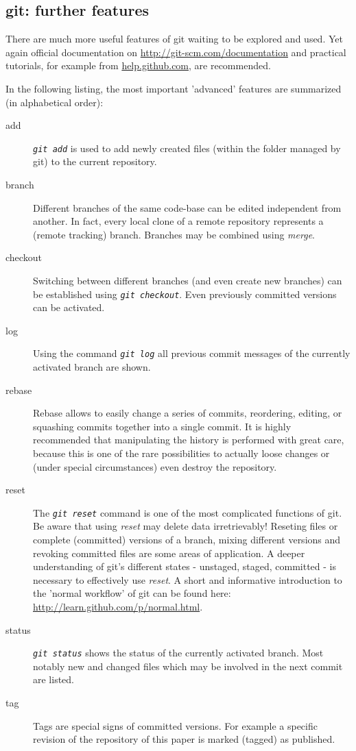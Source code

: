 \documentclass{ifacconf}
\begin{document}
\subsection{git: further features}
There are much more useful features of git waiting to be explored and used. Yet again
official documentation on \url{http://git-scm.com/documentation} and practical
tutorials, for example from \url{help.github.com}, are recommended.

In the following listing, the most important 'advanced' features are summarized
(in alphabetical order):
\begin{description}
\item [add] \textit{\lstinline!git add!} is used to add newly created files (within the  folder managed by git) to the current repository.
\item [{branch}] Different branches of the same code-base can be edited independent from
another. In fact, every local clone of a remote repository represents a (remote tracking) 
branch. Branches may be combined using \textit{merge}.
\item [checkout] Switching between different branches (and even create new branches) can
be established using \textit{\lstinline!git checkout!}. Even previously committed versions
can be activated.
\item [log] Using the command \textit{\lstinline!git log!} all previous commit messages of
the currently activated branch are shown.
\item [{rebase}] Rebase allows to easily change a series of commits, reordering, editing, or squashing commits together into a single commit. 
It is highly recommended that manipulating the history is performed with great care, because this is one of the 
rare possibilities to actually loose changes or (under special circumstances) even destroy the repository.
\item [reset] The \textit{\lstinline!git reset!} command is one of the most complicated
functions of git. Be aware that using \textit{reset} may delete data
irretrievably! Reseting files or complete (committed) versions
of a branch, mixing different versions and revoking committed files are some areas of application. 
A deeper understanding of git's different states -
unstaged, staged, committed - is necessary to effectively use \textit{reset}. A short
and informative introduction to the 'normal workflow' of git can be found here: \url{http://learn.github.com/p/normal.html}.
\item [status] \textit{\lstinline!git status!} shows the status of
the currently activated branch. Most notably new and changed files which may be involved
in the next commit are listed.
\item [tag] Tags are special signs of committed versions. For example a specific revision
of the repository of this paper is marked (tagged) as published.
\end{description}
\end{document}
